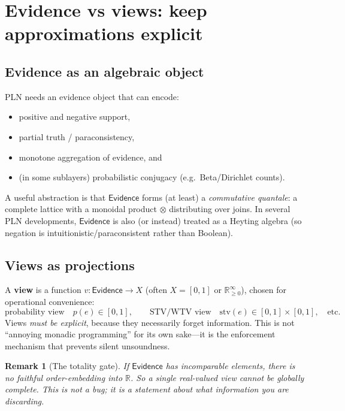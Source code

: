 \documentclass[11pt]{article}
\newtheorem{remark}{Remark}
\newcommand{\Evidence}{\mathsf{Evidence}}
\newcommand{\tensor}{\mathbin{\otimes}}  %
\begin{document}
\section{Evidence vs views: keep approximations explicit}

\subsection{Evidence as an algebraic object}

PLN needs an evidence object that can encode:
\begin{itemize}[leftmargin=2em]
\item positive and negative support,
\item partial truth / paraconsistency,
\item monotone aggregation of evidence, and
\item (in some sublayers) probabilistic conjugacy (e.g.\ Beta/Dirichlet counts).
\end{itemize}

A useful abstraction is that $\Evidence$ forms (at least) a \emph{commutative quantale}:
a complete lattice with a monoidal product $\tensor$ distributing over joins.
In several PLN developments, $\Evidence$ is also (or instead) treated as a Heyting algebra
(so negation is intuitionistic/paraconsistent rather than Boolean).

\subsection{Views as projections}

A \textbf{view} is a function $v:\Evidence\to X$ (often $X=[0,1]$ or $\mathbb{R}_{\ge 0}^\infty$),
chosen for operational convenience:
\[
  \text{probability view}\quad p(e) \in [0,1], \qquad
  \text{STV/WTV view}\quad \mathrm{stv}(e)\in [0,1]\times[0,1], \quad \text{etc.}
\]
Views \emph{must be explicit}, because they necessarily forget information.
This is not ``annoying monadic programming'' for its own sake---it is the enforcement
mechanism that prevents silent unsoundness.

\begin{remark}[The totality gate]
If $\Evidence$ has incomparable elements, there is no faithful order-embedding into $\mathbb{R}$.
So a single real-valued view cannot be globally complete.
This is not a bug; it is a statement about what information you are discarding.
\end{remark}
\end{document}
